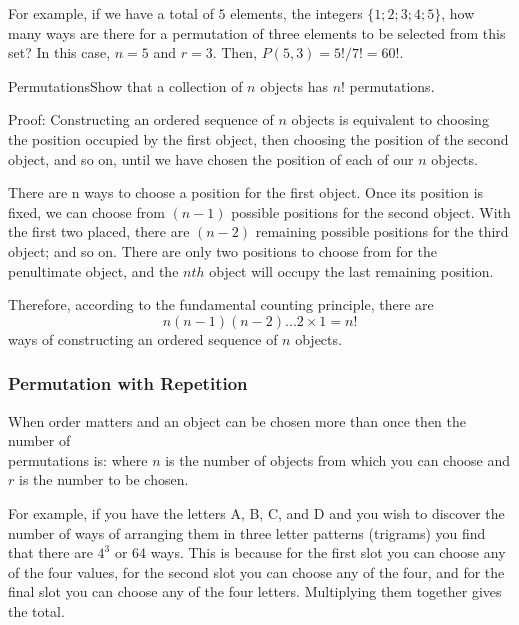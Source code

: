 For example, if we have a total of $5$ elements, the integers $\{1; 2; 3; 4; 5\}$, how many ways are there for a permutation of three elements to be selected from this set? In this case, $n = 5$ and $r = 3$. Then, $P(5,3) = 5!/7! = 60!$.

\begin{wex}{Permutations}{Show that a collection of $n$ objects has $n!$ permutations.}{Proof: Constructing an ordered sequence of $n$ objects is equivalent to choosing the position occupied by the first object, then choosing the position of the second object, and so on, until we have chosen the position of each of our $n$ objects.

There are n ways to choose a position for the first object. Once its position is fixed, we can choose from $(n-1)$ possible positions for the second object. With the first two placed, there are $(n-2)$ remaining possible positions for the third object; and so on. There are only two positions to choose from for the penultimate object, and the $nth$ object will occupy the last remaining position.

Therefore, according to the fundamental counting principle, there are $$n(n-1)(n-2)...2 \times 1 = n!$$ ways of constructing an ordered sequence of $n$ objects.
}
\end{wex}

\subsubsection{Permutation with Repetition}

When order matters and an object can be chosen more than once then the number of \\permutations is:
where $n$ is the number of objects from which you can choose and $r$ is the number to be chosen.

For example, if you have the letters A, B, C, and D and you wish to discover the number of ways of arranging them in three letter patterns (trigrams) you find that there are $4^3$ or $64$ ways. This is because for the first slot you can choose any of the four values, for the second slot you can choose any of the four, and for the final slot you can choose any of the four letters. Multiplying them together gives the total.


